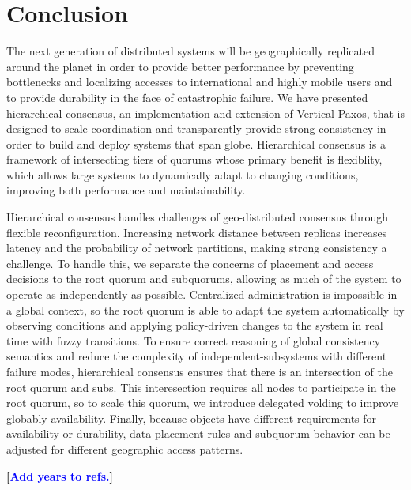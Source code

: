\documentclass[11pt,conference]{IEEEtran}
\newcommand{\hc}{hierarchical consensus\xspace}
\newcommand{\Hc}{Hierarchical consensus\xspace}
\newcommand{\subs}{subquorums\xspace}
\newcommand{\roo}{root quorum\xspace}
\renewcommand{\pjk}[1]{{\bf
    [\marginpar[\hbox{{\textcolor{blue}{pjk}}\raisebox{0ex}{\Huge $\rightarrow$}}]%
{\hbox{\raisebox{0ex}{\Huge $\leftarrow$}{\textcolor{blue}{pjk}}}}\textcolor{blue}{#1}]}}
\begin{document}
\section{Conclusion}

The next generation of distributed systems will be geographically replicated around the
planet in order to provide better performance by preventing bottlenecks and localizing
accesses to international and highly mobile users and to provide durability in the face
of catastrophic failure.
We have presented \hc, an implementation and extension of Vertical Paxos, that is
designed to scale coordination and transparently provide strong consistency in order to
build and deploy systems that span globe.
\Hc is a framework of intersecting tiers of quorums whose primary benefit is flexiblity,
which allows large systems to dynamically adapt to changing conditions, improving both
performance and maintainability.

\Hc handles challenges of geo-distributed consensus through flexible reconfiguration.
Increasing network distance between replicas increases latency and the probability of
network partitions, making strong consistency a challenge.
To handle this, we separate the concerns of placement and access decisions to the \roo
and \subs, allowing as much of the system to operate as independently as possible.
Centralized administration is impossible in a global context, so the \roo is able to
adapt the system automatically by observing conditions and applying policy-driven
changes to the system in real time with fuzzy transitions.
To ensure correct reasoning of global consistency semantics and reduce the complexity of
independent-subsystems with different failure modes, \hc ensures that there is an
intersection of the \roo and subs.
This interesection requires all nodes to participate in the root quorum, so to scale
this quorum, we introduce delegated volding to improve globably availability.
Finally, because objects have different requirements for availability or durability,
data placement rules and subquorum behavior can be adjusted for different geographic
access patterns.


\pjk{Add years to refs.}



\end{document}
